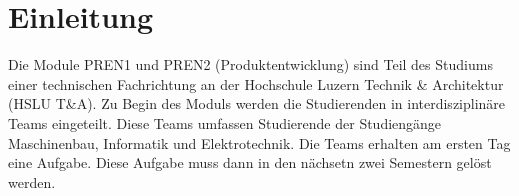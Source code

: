 \section{Einleitung}
Die Module PREN1 und PREN2 (Produktentwicklung) sind Teil des Studiums einer 
technischen Fachrichtung an der Hochschule Luzern Technik \& Architektur 
(HSLU T\&A). 
Zu Begin des Moduls werden die Studierenden in interdisziplinäre Teams 
eingeteilt. Diese Teams umfassen Studierende der Studiengänge Maschinenbau, 
Informatik und Elektrotechnik. Die Teams erhalten am ersten Tag eine Aufgabe. 
Diese Aufgabe muss dann in den nächsetn zwei Semestern gelöst werden. 
